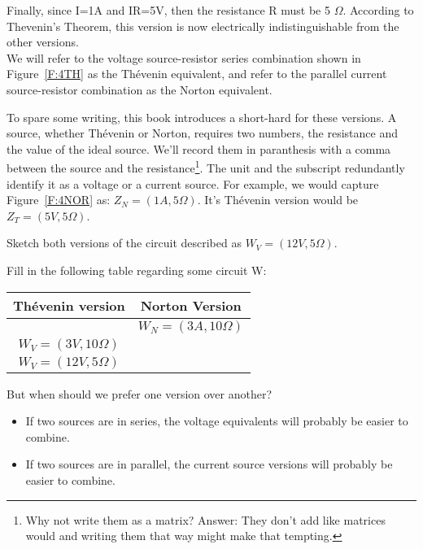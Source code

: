 Finally, since I=1A and IR=5V, then the resistance R must be 5 $\Omega$. According to Thevenin's Theorem, this version is now electrically indistinguishable from the other versions.
\\

We will refer to the voltage source-resistor series combination shown in Figure~\ref{F:4TH} as the Th\'{e}venin equivalent, and refer to the parallel current source-resistor combination as the Norton equivalent. 
\par
To spare some writing, this book introduces a short-hard for these versions. A source, whether Th\'{e}venin or Norton, requires two numbers, the resistance and the value of the ideal source. We'll record them in paranthesis with a comma between the source and the resistance\footnote{Why not write them as a matrix? Answer: They don't add like matrices would and writing them that way might make that tempting.}. The unit and the subscript redundantly identify it as a voltage or a current source. For example, we would capture Figure~\ref{F:4NOR} as: $Z_N=(1A,5\Omega)$. It's Th\'{e}venin version would be $Z_T=(5V,5\Omega)$.
\par
\begin{alevel}
Sketch both versions of the circuit described as $W_V=(12V,5\Omega)$. 
\end{alevel}

\begin{blevel}
Fill in the following table regarding some circuit W:
\begin{table}[H]
\begin{center}
\begin{tabular}{|c|c|} \hline
Th\'{e}venin version & Norton Version \\ \hline
&$W_N=(3A,10\Omega)$ \\ \hline
$W_V=(3V,10\Omega)$& \\ \hline
$W_V=(12V,5\Omega)$& \\ \hline
\end{tabular}
\end{center}
\end{table}
\end{blevel}


But when should we prefer one version over another?
\begin{itemize}
\item If two sources are in series, the voltage equivalents will probably be easier to combine.
\item If two sources are in parallel, the current source versions will probably be easier to combine.
\end{itemize}

